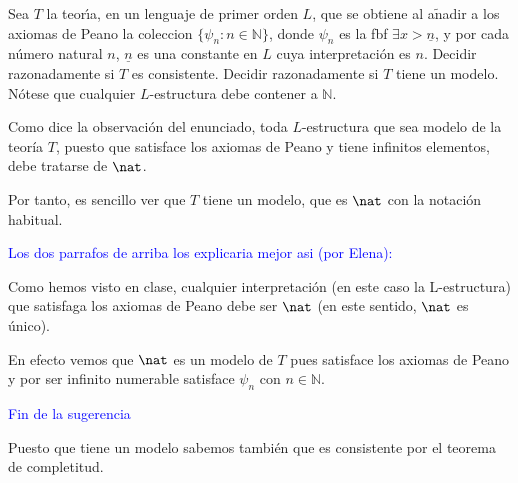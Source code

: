 \begin{problem} Sea $T$ la teor\'{\i}a, 
 en un lenguaje de primer orden  $L$, que se obtiene al a$\operatorname{\tilde{n}}$adir a los
axiomas de Peano la coleccion $\{ \psi_n: n\in\mathbb{N}\}$, donde
$\psi_n$ es la fbf $\exists x > \underline{n}$,  y  por cada n\'umero natural $n$,  $ \underline{n}$ es una constante
en $L$ cuya interpretaci\'on es $n$.
 Decidir razonadamente si 
$T$ es consistente. Decidir razonadamente si $T$ tiene un modelo. 
\obs N\'otese que  cualquier
$L$-estructura debe contener a $\mathbb{N}$.
\solution


Como dice la observación del enunciado, toda $L$-estructura que sea modelo de la teoría $T$, puesto que satisface los axiomas de Peano y tiene infinitos elementos, debe tratarse de $\nat$.

Por tanto, es sencillo ver que $T$ tiene un modelo, que es $\nat$ con la notación habitual.

\textcolor{blue}{Los dos parrafos de arriba los explicaria mejor asi (por Elena):}

Como hemos visto en clase, cualquier interpretación (en este caso la L-estructura) que satisfaga los axiomas de Peano debe ser $\nat$ (en este sentido, $\nat$ es único).
 
En efecto vemos que $\nat$ es un modelo de $T$ pues satisface los axiomas de Peano y por ser infinito numerable satisface $\psi_n$ con $n\in\mathbb{N}$.

\textcolor{blue}{Fin de la sugerencia}

Puesto que tiene un modelo sabemos también que es consistente por el teorema de completitud.

\end{problem}